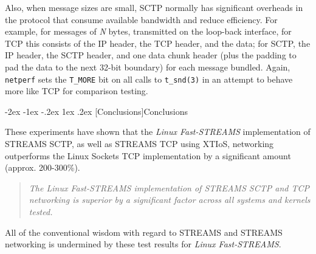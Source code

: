 \documentclass[letterpaper,final,notitlepage,twocolumn,10pt,twoside]{article}
\makeatletter
\renewcommand\section{\@startsection {section}{1}{\z@}%
                                   {-2ex \@plus -1ex \@minus -.2ex}%
                                   {1ex \@plus .2ex}%
                                   {\normalfont\large\bfseries}}
\makeatother
\begin{document}
Also, when message sizes are small, SCTP normally has significant overheads in the protocol that
consume available bandwidth and reduce efficiency.  For example, for messages of \textsl{N} bytes,
transmitted on the loop-back interface, for TCP this consists of the IP header, the TCP header, and
the data; for SCTP, the IP header, the SCTP header, and one data chunk header (plus the padding to
pad the data to the next 32-bit boundary) for each message bundled.  Again, \texttt{netperf} sets
the \texttt{T\_MORE} bit on all calls to \texttt{t\_snd(3)} in an attempt to behave more like TCP
for comparison testing.

\section[Conclusions]{Conclusions}

These experiments have shown that the \textsl{Linux Fast-STREAMS} implementation of STREAMS SCTP,
as well as STREAMS TCP using XTIoS, networking outperforms the Linux Sockets TCP implementation by a
significant amount (approx. 200-300\%).

\begin{quote}
\textit{The \textsl{Linux Fast-STREAMS} implementation of STREAMS SCTP and TCP networking is
superior by a significant factor across all systems and kernels tested.}
\end{quote}

All of the conventional wisdom with regard to STREAMS and STREAMS networking is undermined by these
test results for \textsl{Linux Fast-STREAMS}.
\end{document}
